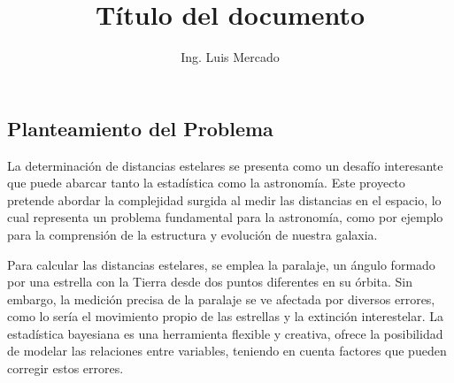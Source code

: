 \documentclass[stu, 12pt, letterpaper, donotrepeattitle, floatsintext, natbib]{apa7}
\title{\Large Título del documento}
\author{Ing. Luis Mercado} %
\newcommand{\myparagraph}[1]{\paragraph{#1}\mbox{}\\}
\begin{document}
\maketitle



\renewcommand\contentsname{\large{Índice}}
\tableofcontents
\setcounter{tocdepth}{2}
\newpage







\subsection{Planteamiento del Problema}

La determinación de distancias estelares se presenta como un
desafío interesante que puede abarcar tanto la estadística
como la astronomía. Este proyecto pretende abordar la
complejidad surgida al medir las distancias en el espacio,
lo cual representa un problema fundamental para la astronomía,
como por ejemplo para la comprensión de la estructura y evolución
de nuestra galaxia.

Para calcular las distancias estelares, se emplea la paralaje,
un ángulo formado por una estrella con la Tierra desde dos puntos
diferentes en su órbita. Sin embargo, la medición precisa de la paralaje
se ve afectada por diversos errores, como lo sería el movimiento propio
de las estrellas y la extinción interestelar. La estadística bayesiana
es una herramienta flexible y creativa, ofrece la posibilidad de modelar
las relaciones entre variables, teniendo en cuenta factores que pueden
corregir estos errores.
\end{document}
